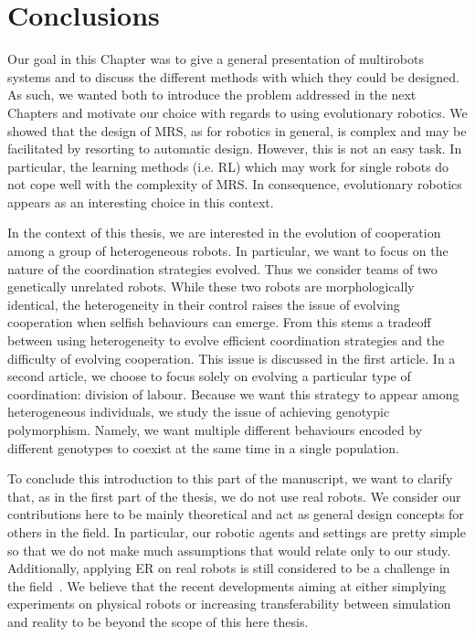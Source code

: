 \section{Conclusions}

  Our goal in this Chapter was to give a general presentation of multirobots systems and to discuss the different methods with which they could be designed. As such, we wanted both to introduce the problem addressed in the next Chapters and motivate our choice with regards to using evolutionary robotics. We showed that the design of MRS, as for robotics in general, is complex and may be facilitated by resorting to automatic design. However, this is not an easy task. In particular, the learning methods (i.e. RL) which may work for single robots do not cope well with the complexity of MRS. In consequence, evolutionary robotics appears as an interesting choice in this context.

  In the context of this thesis, we are interested in the evolution of cooperation among a group of heterogeneous robots. In particular, we want to focus on the nature of the coordination strategies evolved. Thus we consider teams of two genetically unrelated robots. While these two robots are morphologically identical, the heterogeneity in their control raises the issue of evolving cooperation when selfish behaviours can emerge. From this stems a tradeoff between using heterogeneity to evolve efficient coordination strategies and the difficulty of evolving cooperation. This issue is discussed in the first article. In a second article, we choose to focus solely on evolving a particular type of coordination: division of labour. Because we want this strategy to appear among heterogeneous individuals, we study the issue of achieving genotypic polymorphism. Namely, we want multiple different behaviours encoded by different genotypes to coexist at the same time in a single population.

  To conclude this introduction to this part of the manuscript, we want to clarify that, as in the first part of the thesis, we do not use real robots. We consider our contributions here to be mainly theoretical and act as general design concepts for others in the field. In particular, our robotic agents and settings are pretty simple so that we do not make much assumptions that would relate only to our study. Additionally, applying ER on real robots is still considered to be a challenge in the field~\parencite{Floreano2008, Doncieux2015a}. We believe that the recent developments aiming at either simplying experiments on physical robots or increasing transferability between simulation and reality to be beyond the scope of this here thesis. 


